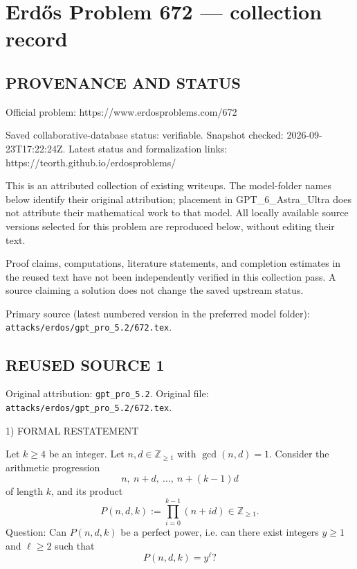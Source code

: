 \section*{Erd\H{o}s Problem 672 --- collection record}

\subsection*{PROVENANCE AND STATUS}
Official problem: https://www.erdosproblems.com/672

Saved collaborative-database status: verifiable.
Snapshot checked: 2026-09-23T17:22:24Z.
Latest status and formalization links: https://teorth.github.io/erdosproblems/

This is an attributed collection of existing writeups. The model-folder names below identify their original attribution; placement in GPT\_6\_Astra\_Ultra does not attribute their mathematical work to that model. All locally available source versions selected for this problem are reproduced below, without editing their text.

Proof claims, computations, literature statements, and completion estimates in the reused text have not been independently verified in this collection pass. A source claiming a solution does not change the saved upstream status.

Primary source (latest numbered version in the preferred model folder): \texttt{attacks/erdos/gpt\_pro\_5.2/672.tex}.

\subsection*{REUSED SOURCE 1}
Original attribution: \texttt{gpt\_pro\_5.2}.
Original file: \texttt{attacks/erdos/gpt\_pro\_5.2/672.tex}.


1) FORMAL RESTATEMENT

Let $k\ge 4$ be an integer. Let $n,d\in\mathbb Z_{\ge 1}$ with $\gcd(n,d)=1$. Consider the arithmetic progression
\[
 n,\ n+d,\ \dots,\ n+(k-1)d
\]
of length $k$, and its product
\[
 P(n,d,k):=\prod_{i=0}^{k-1}(n+id)\in\mathbb Z_{\ge 1}.
\]
Question: Can $P(n,d,k)$ be a perfect power, i.e. can there exist integers $y\ge 1$ and $\ell\ge 2$ such that
\[
 P(n,d,k)=y^{\ell}?
\]

